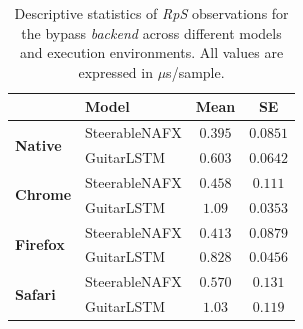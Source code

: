 \begin{table}[htbp]
\caption{Descriptive statistics of \emph{RpS} observations for the bypass \emph{backend} across different models and execution environments. All values are expressed in $\mu$s/sample.}
\label{tab:runtime-overview}
\centering
\setlength{\tabcolsep}{3pt}
\begin{tabular}{llcc}
\toprule
& \textbf{Model} & \textbf{Mean} & \textbf{SE} \\
\midrule
  \multirow{2}{*}{\textbf{Native}} & SteerableNAFX & $0.395$ & $0.0851$ \\
   & GuitarLSTM & $0.603$ & $0.0642$ \\
\midrule
  \multirow{2}{*}{\textbf{Chrome}} & SteerableNAFX & $0.458$ & $0.111$ \\
   & GuitarLSTM & $1.09$ & $0.0353$ \\
\midrule
  \multirow{2}{*}{\textbf{Firefox}} & SteerableNAFX & $0.413$ & $0.0879$ \\
   & GuitarLSTM & $0.828$ & $0.0456$ \\
\midrule
  \multirow{2}{*}{\textbf{Safari}} & SteerableNAFX & $0.570$ & $0.131$ \\
   & GuitarLSTM & $1.03$ & $0.119$ \\
\bottomrule
\end{tabular}
\end{table}
